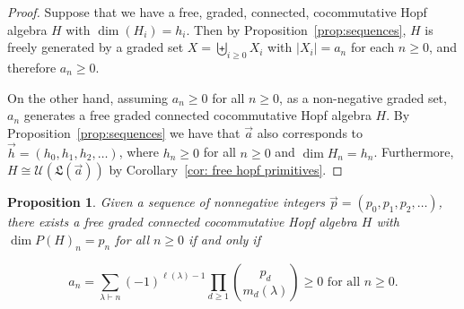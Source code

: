 \documentclass[11pt]{amsart}
\newtheorem{proposition}[theorem]{Proposition}
\theoremstyle{definition}
\numberwithin{equation}{section}
\begin{document}
\begin{proof}

Suppose that we have a free, graded, connected, cocommutative Hopf algebra $H$ with $\dim(H_{i}) = h_{i}$.  Then by Proposition~\ref{prop:sequences}, $H$ is freely generated by a graded set $X = \biguplus_{i \ge 0} X_{i}$ with $|X_{i}| = a_{n}$ for each $n \ge 0$, and therefore $a_{n} \ge 0$.

On the other hand, assuming \(a_n \geq 0\) for all \(n \geq 0\), as a non-negative graded set, \(a_n\) generates a free graded connected cocommutative Hopf algebra \(H\). By Proposition~\ref{prop:sequences}  we have that  \(\vec{a}\) also corresponds to 
\(\vec{h} = (h_0, h_1, h_2, \ldots)\), where \(h_n \geq 0\) for all \(n \geq 0\) and \(\dim{H_n} = h_n\). 
Furthermore, \(H \cong \mathcal{U}(\mathfrak{L}(\vec{a}))\) by Corollary~\ref{cor: free hopf primitives}.
%
\end{proof}

\begin{proposition}
	Given a sequence of nonnegative integers $\vec{p} = (p_0, p_1, p_2, \ldots)$, there exists a free graded connected cocommutative Hopf algebra $H$ with $\dim P(H)_n = p_n$ for all $n \geq 0$ if and only if 
	
	$$a_n = \sum_{\lambda \vdash n} (-1)^{\ell(\lambda)-1} \prod_{d \geq 1} \binom{p_d}{m_d(\lambda)} \geq 0 \text{ for all } n\geq 0.$$ 
\end{proposition}
\end{document}

